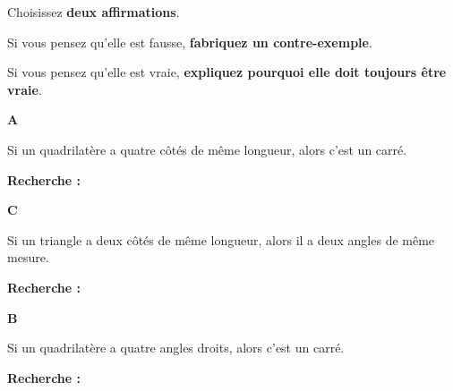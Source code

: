 \documentclass[10pt,a4paper]{article}
\newcommand{\grandeactivite}[2]{%
\begin{tcolorbox}[
  enhanced,
  colback=white,
  colframe=NeutreC!55,
  boxrule=0.6pt,
  arc=1.5mm,
  left=4mm,
  right=4mm,
  top=2.5mm,
  bottom=2.5mm,
  title={\sffamily\bfseries\color{TitreC}#1},
  coltitle=TitreC,
  colbacktitle=NeutreBg
]
#2
\end{tcolorbox}
}
\begin{document}
\grandeactivite{Convaincre}{

Choisissez \textbf{deux affirmations}.

\medskip

Si vous pensez qu'elle est fausse,
\textbf{fabriquez un contre-exemple}.

Si vous pensez qu'elle est vraie,
\textbf{expliquez pourquoi elle doit toujours être vraie}.

\vspace{0.3cm}

\begin{minipage}[t]{0.48\linewidth}

\begin{tcolorbox}[
  colback=white,
  colframe=NeutreC!45,
  boxrule=0.5pt,
  height=5.3cm
]
\textbf{A}

\vspace{0.3cm}

Si un quadrilatère a quatre côtés de même longueur,
alors c'est un carré.

\vfill

\textbf{Recherche :}
\end{tcolorbox}

\vspace{0.2cm}

\begin{tcolorbox}[
  colback=white,
  colframe=NeutreC!45,
  boxrule=0.5pt,
  height=5.3cm
]
\textbf{C}

\vspace{0.3cm}

Si un triangle a deux côtés de même longueur,
alors il a deux angles de même mesure.

\vfill

\textbf{Recherche :}
\end{tcolorbox}

\end{minipage}
\hfill
\begin{minipage}[t]{0.48\linewidth}

\begin{tcolorbox}[
  colback=white,
  colframe=NeutreC!45,
  boxrule=0.5pt,
  height=5.3cm
]
\textbf{B}

\vspace{0.3cm}

Si un quadrilatère a quatre angles droits,
alors c'est un carré.

\vfill

\textbf{Recherche :}
\end{tcolorbox}


\end{minipage}}
\end{document}
